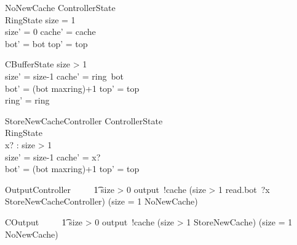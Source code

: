 \documentclass{article}
\begin{document}
\begin{schema}{NoNewCache}
    \Delta ControllerState
    \\%
    \Xi RingState
\where
           size = 1
            \\%
            size' = 0 \land cache' = cache
            \\%
            bot' = bot \land top' = top
\end{schema}


\begin{StoreNewCache}
    \Delta CBufferState
\where
            size > 1
            \\
            size' = size-1 \land cache' = ring~bot
            \\
            bot' = (bot \mod maxring)+1 \land top' = top
            \\
            ring' = ring
\end{StoreNewCache}

\begin{schema}{StoreNewCacheController}
    \Delta ControllerState
            \\%
            \Xi RingState
            \\%
            x? : \nat
\where
            size > 1
            \\%
            size' = size-1 \land cache' = x?
            \\%
            bot' = (bot \mod maxring)+1 \land top' = top
\end{schema}

\begin{circusaction}
    OutputController ~~\circdef~~
            \t1 \lcircguard size > 0 \rcircguard \circguard output~!cache \then
            (\lcircguard size > 1 \rcircguard \circguard read.bot~?x \then StoreNewCacheController)
            \extchoice
            (\lcircguard size = 1 \rcircguard \circguard NoNewCache)
\end{circusaction}

\begin{circusaction}
    COutput ~~\circdef~~
            \t1 \lcircguard size > 0 \rcircguard \circguard output~!cache \then
            (\lcircguard size > 1 \rcircguard \circguard StoreNewCache)
            \extchoice
            (\lcircguard size = 1 \rcircguard \circguard NoNewCache)
\end{circusaction}
\end{document}
